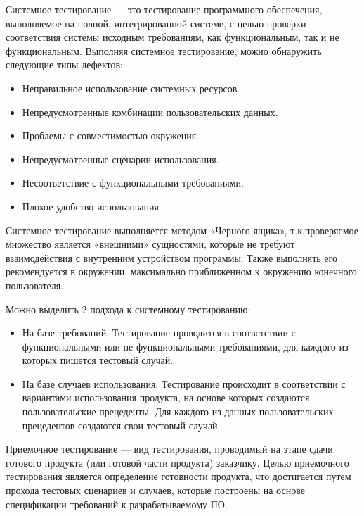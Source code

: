 \documentclass[12pt]{article}
\begin{document}
    Системное тестирование --- это тестирование программного обеспечения, выполняемое на полной, интегрированной системе, с целью проверки соответствия системы исходным требованиям, как функциональным, так и не функциональным. Выполняя системное тестирование, можно обнаружить следующие типы дефектов:
    \begin{itemize}
        \item Неправильное использование системных ресурсов.
        \item Непредусмотренные комбинации пользовательских данных.
        \item Проблемы с совместимостью окружения.
        \item Непредусмотренные сценарии использования.
        \item Несоответствие с функциональными требованиями.
        \item Плохое удобство использования.
    \end{itemize}

    Системное тестирование выполняется методом «Черного ящика», т.к.проверяемое множество является «внешними» сущностями, которые не требуют взаимодействия с внутренним устройством программы. Также выполнять его рекомендуется в окружении, максимально приближенном к окружению конечного пользователя.

    \vspace{5pt}

    Можно выделить 2 подхода к системному тестированию:
    \begin{itemize}
        \item На базе требований. Тестирование проводится в соответствии с функциональными или не функциональными требованиями, для каждого из которых пишется тестовый случай.
        \item На базе случаев использования. Тестирование происходит в соответствии с вариантами использования продукта, на основе которых создаются пользовательские прецеденты. Для каждого из данных пользовательских прецедентов создаются свои тестовый случай.
    \end{itemize}
    Приемочное тестирование --- вид тестирования, проводимый на этапе сдачи готового продукта (или готовой части продукта) заказчику. Целью приемочного тестирования является определение готовности продукта, что достигается путем прохода тестовых сценариев и случаев, которые построены на основе спецификации требований к разрабатываемому ПО.

    \vspace{5pt}
\end{document}
